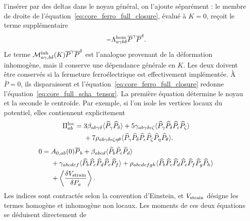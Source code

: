 l'insérer par des deltas dans le noyau général, on l'ajoute séparément : le
membre de droite de l'équation~\eqref{eq:core_ferro_full_closure}, évalué à $K=0$,
reçoit le terme supplémentaire
\begin{equation}
 -\Lambda^{\rm hom}_{a\gamma b\delta}
 \overline P^\gamma\overline P^\delta.
\label{eq:core_ferro_homogeneous_uniform_channel}
\end{equation}
Le terme
$\mathcal M^{\rm inh}_{a\gamma,b\delta}(K)
\overline P^\gamma\overline P^\delta$ est l'analogue provenant de la
déformation inhomogène, mais il conserve une dépendance générale en $K$.
Les deux doivent être conservés si la fermeture ferroélectrique est
effectivement implémentée. À $\overline P=0$, ils disparaissent et
l'équation~\eqref{eq:core_ferro_full_closure} redonne
l'équation~\eqref{eq:core_full_scha_tensor}.
La première équation détermine le noyau et la seconde le centroïde. Par
exemple, si l'on isole les vertices locaux du potentiel, elles contiennent
explicitement
\begin{equation}
\begin{aligned}
\Pi_{ab}^{\rm loc}={}&3\beta_{ab\gamma\delta}
\langle\widehat P_\gamma\widehat P_\delta\rangle
+5\gamma_{ab\gamma\delta\epsilon\zeta}
\langle\widehat P_\gamma\widehat P_\delta
\widehat P_\epsilon\widehat P_\zeta\rangle\\
&+7\rho_{ab\gamma\delta\epsilon\zeta\eta\theta}
\langle\widehat P_\gamma\widehat P_\delta
\widehat P_\epsilon\widehat P_\zeta
\widehat P_\eta\widehat P_\theta\rangle .
\end{aligned}
\label{eq:core_ferro_local_self_energy}
\end{equation}
\begin{equation}
\begin{aligned}
0={}&A_{0,ab}(0)\overline P_b
+\beta_{abcd}\langle\widehat P_b\widehat P_c\widehat P_d\rangle\\
&+\gamma_{abcdef}\langle\widehat P_b\widehat P_c\widehat P_d
\widehat P_e\widehat P_f\rangle
+\rho_{abcdefgh}\langle\widehat P_b\widehat P_c\widehat P_d
\widehat P_e\widehat P_f\widehat P_g\widehat P_h\rangle\\
&+\left\langle\frac{\delta V_{\rm strain}}{\delta P_a}\right\rangle .
\end{aligned}
\label{eq:core_ferro_centroid_equation}
\end{equation}
Les indices sont contractés selon la convention d'Einstein, et
$V_{\rm strain}$ désigne les termes homogène et inhomogène non locaux. Les
moments de ces deux équations se déduisent directement de
